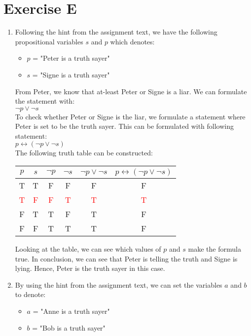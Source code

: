 \section{Exercise E}

\begin{enumerate}
\item 
Following the hint from the assignment text, we have the following propositional variables $s$ and $p$ which denotes: 
\begin{itemize}
    \item $p$ = "Peter is a truth sayer"
    \item $s$ = "Signe is a truth sayer"
\end{itemize}

From Peter, we know that at-least Peter or Signe is a liar. We can formulate the statement with: \\
$ \neg p \lor \neg s$ \\

To check whether Peter or Signe is the liar, we formulate a statement where Peter is set to be the truth sayer. This can be formulated with following statement:  \\
$p \leftrightarrow (\neg p \lor \neg s) $ \\

The following truth table can be constructed:
\begin{center}
\begin{tabular}{ |c|c||c|c|c|c| } 
\hline
$p$ & $s$ & $\neg p$ & $\neg s$ & $\neg p \lor \neg s$ & $p \leftrightarrow (\neg p \lor \neg s) $  \\
\hline
\hline
T & T & F & F & F & F\\
\hline
 \textcolor{red}{T} &  \textcolor{red}{F} & \textcolor{red}{F} & \textcolor{red}{T} & \textcolor{red}{T} &  \textcolor{red}{T}\\
\hline
F & T & T & F & T & F\\
\hline
F & F & T & T & T & F\\
\hline
\end{tabular}
\end{center}

Looking at the table, we can see which values of $p$ and $s$ make the formula true. In conclusion, we can see that Peter is telling the truth and Signe is lying. Hence, Peter is the truth sayer in this case.

\item
By using the hint from the assignment text, we can set the variables $a$ and $b$ to denote: 
\begin{itemize}
    \item $a$ = "Anne is a truth sayer"
    \item $b$ = "Bob is a truth sayer"
\end{itemize}


\end{enumerate}

